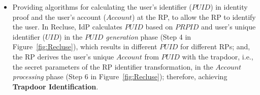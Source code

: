 \begin{itemize}
  \item Providing algorithms for calculating the user's identifier ($PUID$) in identity proof and the user's account ($Account$) at the RP,
   to allow the RP to identify the user.
  In Recluse, IdP calculates $PUID$ based on $PRPID$ and user's unique identifier ($UID$) in the \emph{$PUID$ generation} phase (Step 4 in Figure~\ref{fig:Recluse}), which results in different $PUID$  for different RPs;
  and,  the RP derives the user's unique $Account$  from $PUID$ with the  trapdoor, i.e., the secret parameters of the RP identifier transformation,   in the \emph{$Account$ processing} phase (Step 6 in Figure~\ref{fig:Recluse});
   therefore, achieving \textbf{Trapdoor Identification}.


  
   
\end{itemize}


